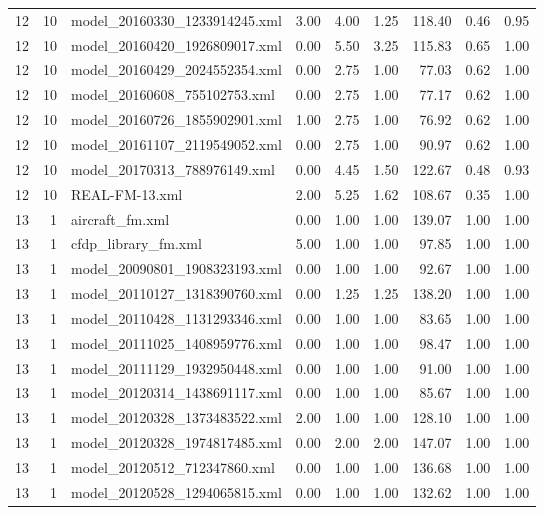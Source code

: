 \begin{table}[ht]
\begin{tabular}{rrlrrrrrr}
   12 &  10 & model\_20160330\_1233914245.xml & 3.00 & 4.00 & 1.25 & 118.40 & 0.46 & 0.95 \\ 
   12 &  10 & model\_20160420\_1926809017.xml & 0.00 & 5.50 & 3.25 & 115.83 & 0.65 & 1.00 \\ 
   12 &  10 & model\_20160429\_2024552354.xml & 0.00 & 2.75 & 1.00 & 77.03 & 0.62 & 1.00 \\ 
   12 &  10 & model\_20160608\_755102753.xml & 0.00 & 2.75 & 1.00 & 77.17 & 0.62 & 1.00 \\ 
   12 &  10 & model\_20160726\_1855902901.xml & 1.00 & 2.75 & 1.00 & 76.92 & 0.62 & 1.00 \\ 
   12 &  10 & model\_20161107\_2119549052.xml & 0.00 & 2.75 & 1.00 & 90.97 & 0.62 & 1.00 \\ 
   12 &  10 & model\_20170313\_788976149.xml & 0.00 & 4.45 & 1.50 & 122.67 & 0.48 & 0.93 \\ 
   12 &  10 & REAL-FM-13.xml & 2.00 & 5.25 & 1.62 & 108.67 & 0.35 & 1.00 \\ 
   13 &   1 & aircraft\_fm.xml & 0.00 & 1.00 & 1.00 & 139.07 & 1.00 & 1.00 \\ 
   13 &   1 & cfdp\_library\_fm.xml & 5.00 & 1.00 & 1.00 & 97.85 & 1.00 & 1.00 \\ 
   13 &   1 & model\_20090801\_1908323193.xml & 0.00 & 1.00 & 1.00 & 92.67 & 1.00 & 1.00 \\ 
   13 &   1 & model\_20110127\_1318390760.xml & 0.00 & 1.25 & 1.25 & 138.20 & 1.00 & 1.00 \\ 
   13 &   1 & model\_20110428\_1131293346.xml & 0.00 & 1.00 & 1.00 & 83.65 & 1.00 & 1.00 \\ 
   13 &   1 & model\_20111025\_1408959776.xml & 0.00 & 1.00 & 1.00 & 98.47 & 1.00 & 1.00 \\ 
   13 &   1 & model\_20111129\_1932950448.xml & 0.00 & 1.00 & 1.00 & 91.00 & 1.00 & 1.00 \\ 
   13 &   1 & model\_20120314\_1438691117.xml & 0.00 & 1.00 & 1.00 & 85.67 & 1.00 & 1.00 \\ 
   13 &   1 & model\_20120328\_1373483522.xml & 2.00 & 1.00 & 1.00 & 128.10 & 1.00 & 1.00 \\ 
   13 &   1 & model\_20120328\_1974817485.xml & 0.00 & 2.00 & 2.00 & 147.07 & 1.00 & 1.00 \\ 
   13 &   1 & model\_20120512\_712347860.xml & 0.00 & 1.00 & 1.00 & 136.68 & 1.00 & 1.00 \\ 
   13 &   1 & model\_20120528\_1294065815.xml & 0.00 & 1.00 & 1.00 & 132.62 & 1.00 & 1.00 \\ 

\end{tabular}
\end{table}
